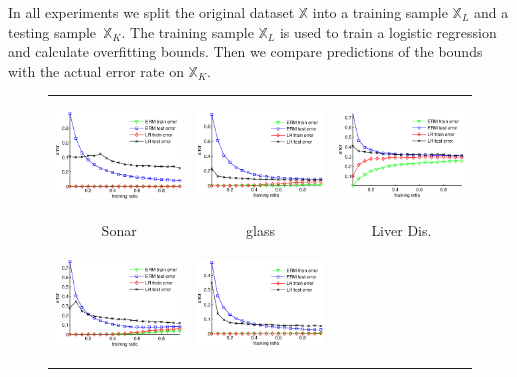 \documentclass{article} %
\def\XX{\mathbb{X}}
\begin{document}
In all experiments we split the original dataset $\XX$ into a training sample $\XX_L$ and a testing sample~$\XX_K$.
The training sample $\XX_L$ is used to train a logistic regression and calculate overfitting bounds.
Then we compare predictions of the bounds with the actual error rate on $\XX_K$.

\begin{figure}[t]
    \begin{tabular}{ccc}
        \includegraphics[width=44mm,height=30mm]{Sonar.eps} &
        \includegraphics[width=44mm,height=30mm]{glass.eps} &
        \includegraphics[width=44mm,height=30mm]{Liver_Disorders.eps} \\
        Sonar &
        glass &
        Liver Dis. \\
        \includegraphics[width=44mm,height=30mm]{Ionosphere.eps} &
        \includegraphics[width=44mm,height=30mm]{Wdbc.eps} &

\end{tabular}
\end{figure}
\end{document}
